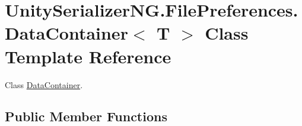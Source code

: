 \hypertarget{class_unity_serializer_n_g_1_1_file_preferences_1_1_data_container}{}\section{Unity\+Serializer\+N\+G.\+File\+Preferences.\+Data\+Container$<$ T $>$ Class Template Reference}
\label{class_unity_serializer_n_g_1_1_file_preferences_1_1_data_container}


Class \hyperlink{class_unity_serializer_n_g_1_1_file_preferences_1_1_data_container}{Data\+Container}.  


\subsection*{Public Member Functions}

